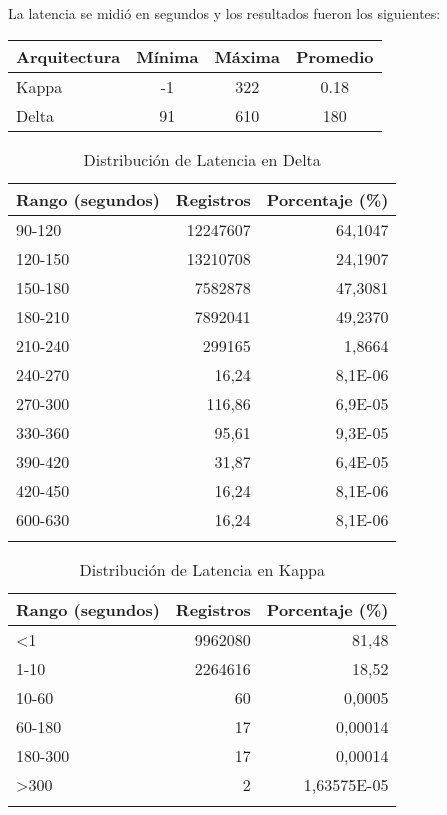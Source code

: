 La latencia se midió en segundos y los resultados fueron los siguientes:

\begin{longtable}{|p{3cm}|c|c|c|}
    \hline
    \textbf{Arquitectura} & \textbf{Mínima} & \textbf{Máxima} & \textbf{Promedio} \\
    \hline
    Kappa & -1 & 322 & 0.18 \\
    \hline
    Delta & 91 & 610 & 180 \\
    \hline
\end{longtable}

\begin{longtable}{|l|r|r|}
    \hline
    \textbf{Rango (segundos)} & \textbf{Registros} & \textbf{Porcentaje (\%)} \\
    \hline
    \endhead
    90-120 & 12247607 & 64,1047 \\
    \hline
    120-150 & 13210708 & 24,1907 \\
    \hline
    150-180 & 7582878 & 47,3081 \\
    \hline
    180-210 & 7892041 & 49,2370 \\
    \hline
    210-240 & 299165 & 1,8664 \\
    \hline
    240-270 & 16,24 & 8,1E-06 \\
    \hline
    270-300 & 116,86 & 6,9E-05 \\
    \hline
    330-360 & 95,61 & 9,3E-05 \\
    \hline
    390-420 & 31,87 & 6,4E-05 \\
    \hline
    420-450 & 16,24 & 8,1E-06 \\
    \hline
    600-630 & 16,24 & 8,1E-06 \\
    \hline
    \caption{Distribución de Latencia en Delta} \\
\end{longtable}

\begin{longtable}{|l|r|r|}
    \hline
    \textbf{Rango (segundos)} & \textbf{Registros} & \textbf{Porcentaje (\%)} \\
    \hline
    \endhead
    <1 & 9962080 & 81,48 \\
    \hline
    1-10 & 2264616 & 18,52 \\
    \hline
    10-60 & 60 & 0,0005 \\
    \hline
    60-180 & 17 & 0,00014 \\
    \hline
    180-300 & 17 & 0,00014 \\
    \hline
    >300 & 2 & 1,63575E-05 \\
    \hline
    \caption{Distribución de Latencia en Kappa} \\
\end{longtable}

